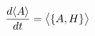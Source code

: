 \documentclass[preview]{standalone}
\begin{document}
\begin{align*}
\special{dvisvgm:raw <g id='unique000'>}\dv{\langle A\rangle}{t}=\big\langle\pb{A}{H}\big\rangle\special{dvisvgm:raw </g>}
\end{align*}
\end{document}
